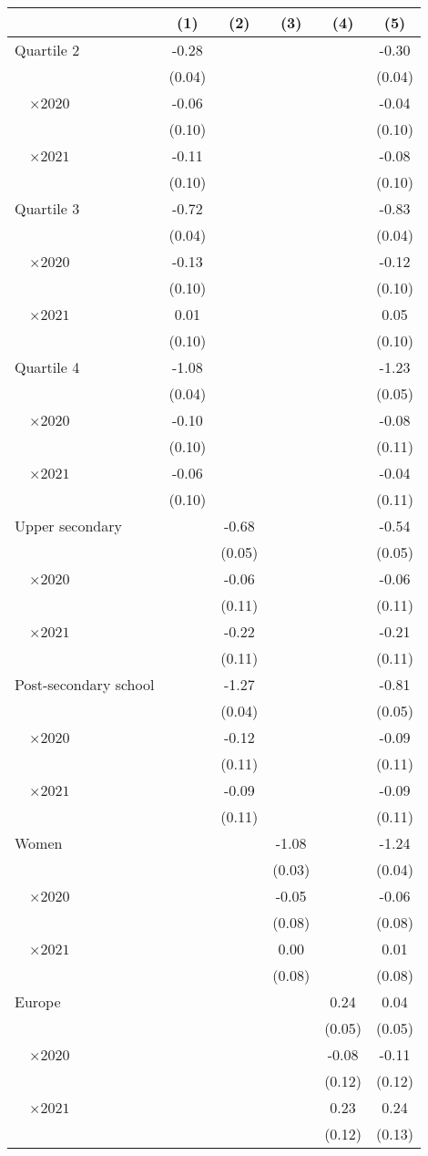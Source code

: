 
\begin{tabular}{@{}l*{5}{S[table-format={-}2.2{\tnote{***}}]}@{}}
\toprule
{} & {(1)} & {(2)} & {(3)} & {(4)} & {(5)}\tabularnewline%
\midrule
Quartile 2 & -0.28\tnote{***} &  &  &  & -0.30\tnote{***}\tabularnewline%
 & (0.04) &  &  &  & \vphantom{1} (0.04)\tabularnewline%
~~\(\times 2020\) & -0.06 &  &  &  & -0.04\tabularnewline%
 & (0.10) &  &  &  & \vphantom{3} (0.10)\tabularnewline%
~~\(\times 2021\) & -0.11 &  &  &  & -0.08\tabularnewline%
 & (0.10) &  &  &  & \vphantom{2} (0.10)\tabularnewline%
Quartile 3 & -0.72\tnote{***} &  &  &  & -0.83\tnote{***}\tabularnewline%
 & (0.04) &  &  &  & (0.04)\tabularnewline%
~~\(\times 2020\) & -0.13 &  &  &  & -0.12\tabularnewline%
 & (0.10) &  &  &  & \vphantom{1} (0.10)\tabularnewline%
~~\(\times 2021\) & 0.01 &  &  &  & 0.05\tabularnewline%
 & (0.10) &  &  &  & (0.10)\tabularnewline%
Quartile 4 & -1.08\tnote{***} &  &  &  & -1.23\tnote{***}\tabularnewline%
 & (0.04) &  &  &  & (0.05)\tabularnewline%
~~\(\times 2020\) & -0.10 &  &  &  & -0.08\tabularnewline%
 & (0.10) &  &  &  & \vphantom{1} (0.11)\tabularnewline%
~~\(\times 2021\) & -0.06 &  &  &  & -0.04\tabularnewline%
 & (0.10) &  &  &  & (0.11)\tabularnewline%
Upper secondary &  & -0.68\tnote{***} &  &  & -0.54\tnote{***}\tabularnewline%
 &  & (0.05) &  &  & (0.05)\tabularnewline%
~~\(\times 2020\) &  & -0.06 &  &  & -0.06\tabularnewline%
 &  & (0.11) &  &  & \vphantom{3} (0.11)\tabularnewline%
~~\(\times 2021\) &  & -0.22\tnote{\dagger} &  &  & -0.21\tnote{\dagger}\tabularnewline%
 &  & (0.11) &  &  & \vphantom{2} (0.11)\tabularnewline%
Post-secondary school &  & -1.27\tnote{***} &  &  & -0.81\tnote{***}\tabularnewline%
 &  & (0.04) &  &  & (0.05)\tabularnewline%
~~\(\times 2020\) &  & -0.12 &  &  & -0.09\tabularnewline%
 &  & (0.11) &  &  & \vphantom{1} (0.11)\tabularnewline%
~~\(\times 2021\) &  & -0.09 &  &  & -0.09\tabularnewline%
 &  & (0.11) &  &  & (0.11)\tabularnewline%
Women &  &  & -1.08\tnote{***} &  & -1.24\tnote{***}\tabularnewline%
 &  &  & (0.03) &  & (0.04)\tabularnewline%
~~\(\times 2020\) &  &  & -0.05 &  & -0.06\tabularnewline%
 &  &  & (0.08) &  & \vphantom{1} (0.08)\tabularnewline%
~~\(\times 2021\) &  &  & 0.00 &  & 0.01\tabularnewline%
 &  &  & (0.08) &  & (0.08)\tabularnewline%
Europe &  &  &  & 0.24\tnote{***} & 0.04\tabularnewline%
 &  &  &  & (0.05) & (0.05)\tabularnewline%
~~\(\times 2020\) &  &  &  & -0.08 & -0.11\tabularnewline%
 &  &  &  & (0.12) & (0.12)\tabularnewline%
~~\(\times 2021\) &  &  &  & 0.23\tnote{\dagger} & 0.24\tnote{\dagger}\tabularnewline%
 &  &  &  & (0.12) & (0.13)\tabularnewline%

\end{tabular}
